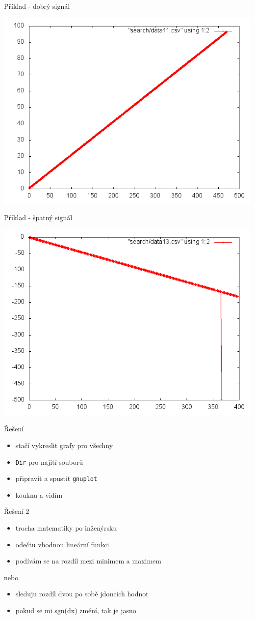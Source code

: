 \documentclass{beamer}
\begin{document}
\begin{frame}{Příklad - dobrý signál}
  \begin{center}
      \includegraphics[width=0.6\columnwidth]{search_good}
      \end{center}
\end{frame}
\begin{frame}{Příklad - špatný signál}
  \begin{center}
      \includegraphics[width=0.6\columnwidth]{search_bad}
      \end{center}
\end{frame}

\begin{frame}{Řešení}
  \begin{itemize}
    \item stačí vykreslit grafy pro všechny
    \item \texttt{Dir} pro najití souborů
    \item připravit a spustit \texttt{gnuplot}  
    \item kouknu a vidím 
  \end{itemize}
\end{frame}

\begin{frame}{Řešení 2}
  \begin{itemize}
    \item trocha matematiky po inženýrsku
    \item odečtu vhodnou lineární funkci
    \item podívám se na rozdíl mezi minimem a maximem
  \end{itemize}
  nebo
  \begin{itemize}
    \item sleduju rozdíl dvou po sobě jdoucích hodnot 
    \item pokud se mi sgn(dx) změní, tak je jasno
  \end{itemize}
\end{frame}
\end{document}
